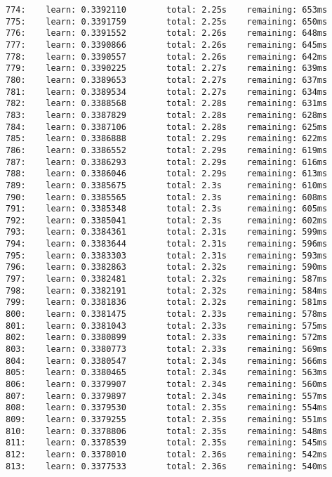 \documentclass[11pt]{article}
\begin{document}
\begin{Verbatim}[commandchars=\\\{\}]
774:    learn: 0.3392110        total: 2.25s    remaining: 653ms
775:    learn: 0.3391759        total: 2.25s    remaining: 650ms
776:    learn: 0.3391552        total: 2.26s    remaining: 648ms
777:    learn: 0.3390866        total: 2.26s    remaining: 645ms
778:    learn: 0.3390557        total: 2.26s    remaining: 642ms
779:    learn: 0.3390225        total: 2.27s    remaining: 639ms
780:    learn: 0.3389653        total: 2.27s    remaining: 637ms
781:    learn: 0.3389534        total: 2.27s    remaining: 634ms
782:    learn: 0.3388568        total: 2.28s    remaining: 631ms
783:    learn: 0.3387829        total: 2.28s    remaining: 628ms
784:    learn: 0.3387106        total: 2.28s    remaining: 625ms
785:    learn: 0.3386888        total: 2.29s    remaining: 622ms
786:    learn: 0.3386552        total: 2.29s    remaining: 619ms
787:    learn: 0.3386293        total: 2.29s    remaining: 616ms
788:    learn: 0.3386046        total: 2.29s    remaining: 613ms
789:    learn: 0.3385675        total: 2.3s     remaining: 610ms
790:    learn: 0.3385565        total: 2.3s     remaining: 608ms
791:    learn: 0.3385348        total: 2.3s     remaining: 605ms
792:    learn: 0.3385041        total: 2.3s     remaining: 602ms
793:    learn: 0.3384361        total: 2.31s    remaining: 599ms
794:    learn: 0.3383644        total: 2.31s    remaining: 596ms
795:    learn: 0.3383303        total: 2.31s    remaining: 593ms
796:    learn: 0.3382863        total: 2.32s    remaining: 590ms
797:    learn: 0.3382481        total: 2.32s    remaining: 587ms
798:    learn: 0.3382191        total: 2.32s    remaining: 584ms
799:    learn: 0.3381836        total: 2.32s    remaining: 581ms
800:    learn: 0.3381475        total: 2.33s    remaining: 578ms
801:    learn: 0.3381043        total: 2.33s    remaining: 575ms
802:    learn: 0.3380899        total: 2.33s    remaining: 572ms
803:    learn: 0.3380773        total: 2.33s    remaining: 569ms
804:    learn: 0.3380547        total: 2.34s    remaining: 566ms
805:    learn: 0.3380465        total: 2.34s    remaining: 563ms
806:    learn: 0.3379907        total: 2.34s    remaining: 560ms
807:    learn: 0.3379897        total: 2.34s    remaining: 557ms
808:    learn: 0.3379530        total: 2.35s    remaining: 554ms
809:    learn: 0.3379255        total: 2.35s    remaining: 551ms
810:    learn: 0.3378806        total: 2.35s    remaining: 548ms
811:    learn: 0.3378539        total: 2.35s    remaining: 545ms
812:    learn: 0.3378010        total: 2.36s    remaining: 542ms
813:    learn: 0.3377533        total: 2.36s    remaining: 540ms

\end{Verbatim}
\end{document}
